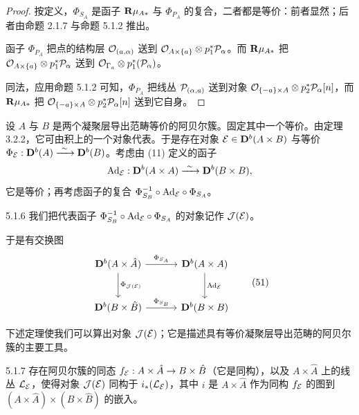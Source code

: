 \begin{proof}
按定义，$\Phi_{S_A}$ 是函子 $\mathbf{R}\mu_{A*}$ 与 $\Phi_{P_A}$ 的复合，二者都是等价：前者显然；后者由命题 2.1.7 与命题 5.1.2 推出。

函子 $\Phi_{P_A}$ 把点的结构层 $\mathcal{O}_{(a,\alpha)}$ 送到 $\mathcal{O}_{A\times\{a\}}\otimes p^*_1\mathcal{P}_\alpha$。而 $\mathbf{R}\mu_{A*}$ 把 $\mathcal{O}_{A\times\{a\}}\otimes p^*_1\mathcal{P}_\alpha$ 送到 $\mathcal{O}_{\Gamma_a}\otimes p^*_1(\mathcal{P}_\alpha)$。

同法，应用命题 5.1.2 可知，$\Phi_{P_A}$ 把线丛 $\mathcal{P}_{(\alpha,a)}$ 送到对象 $\mathcal{O}_{\{-a\}\times A}\otimes p^*_2\mathcal{P}_\alpha[n]$，而 $\mathbf{R}\mu_{A*}$ 把 $\mathcal{O}_{\{-a\}\times A}\otimes p^*_2\mathcal{P}_\alpha[n]$ 送到它自身。
\end{proof}

设 $A$ 与 $B$ 是两个凝聚层导出范畴等价的阿贝尔簇。固定其中一个等价。由定理 3.2.2，它可由积上的一个对象代表。于是存在对象 $\mathcal{E}\in\mathbf{D}^{b}(A\times B)$ 与等价 $\Phi_{\mathcal{E}}:\mathbf{D}^{b}(A)\xrightarrow{\ \sim\ }\mathbf{D}^{b}(B)$。考虑由 (11) 定义的函子
\begin{equation*}
\mathrm{Ad}_{\mathcal{E}}:\mathbf{D}^{b}(A\times A)\xrightarrow{\ \sim\ }\mathbf{D}^{b}(B\times B),
\end{equation*}
它是等价；再考虑函子的复合 $\Phi^{-1}_{S_B}\circ\mathrm{Ad}_{\mathcal{E}}\circ\Phi_{S_A}$。

\begin{definition}{5.1.6}
我们把代表函子 $\Phi^{-1}_{S_B}\circ\mathrm{Ad}_{\mathcal{E}}\circ\Phi_{S_A}$ 的对象记作 $\mathcal{J}(\mathcal{E})$。
\end{definition}

于是有交换图
\begin{equation}
\begin{tikzcd}[row sep=2.6em,column sep=3.2em,ampersand replacement=\&]
\Db(A\times\hat A) \arrow[r, "\Phi_{S_A}"] \arrow[d, "\Phi_{\cJ(\cE)}"]
  \& \Db(A\times A) \arrow[d, "\mathrm{Ad}_{\cE}"] \\
\Db(B\times\hat B) \arrow[r, "\Phi_{S_B}"]
  \& \Db(B\times B)
\end{tikzcd}
\tag{51}
\end{equation}

下述定理使我们可以算出对象 $\mathcal{J}(\mathcal{E})$；它是描述具有等价凝聚层导出范畴的阿贝尔簇的主要工具。

\begin{theorem}{5.1.7}
存在阿贝尔簇的同态 $f_{\mathcal{E}}:A\times\hat A\to B\times\hat B$（它是同构），以及 $A\times\hat A$ 上的线丛 $\mathcal{L}_{\mathcal{E}}$，使得对象 $\mathcal{J}(\mathcal{E})$ 同构于 $i_*(\mathcal{L}_{\mathcal{E}})$，其中 $i$ 是 $A\times\hat A$ 作为同构 $f_{\mathcal{E}}$ 的图到 $(A\times\hat A)\times(B\times\hat B)$ 的嵌入。
\end{theorem}

